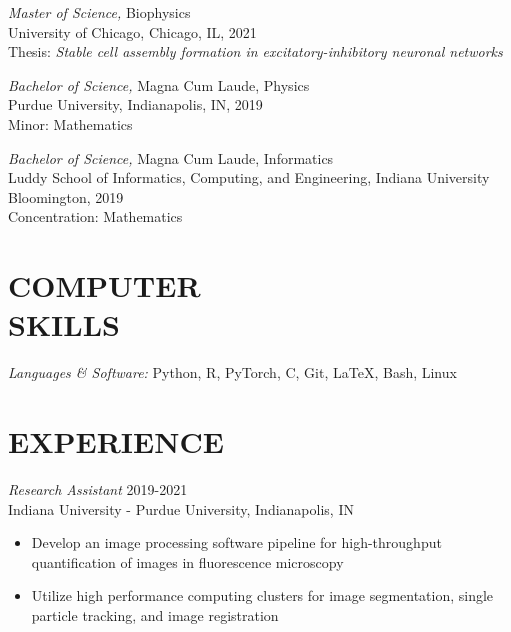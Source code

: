 \documentclass[margin, 10pt]{res} %
\begin{document}
\begin{resume}
{\sl Master of Science,} Biophysics\\
University of Chicago, Chicago, IL, 2021\\
Thesis: \textit{Stable cell assembly formation in excitatory-inhibitory neuronal networks}


{\sl Bachelor of Science,} Magna Cum Laude, Physics \\
Purdue University, Indianapolis, IN, 2019\\
Minor: Mathematics 

{\sl Bachelor of Science,} Magna Cum Laude, Informatics \\
Luddy School of Informatics, Computing, and Engineering, Indiana University Bloomington, 2019\\
Concentration: Mathematics 
 


\section{COMPUTER \\ SKILLS} 

{\sl Languages \& Software:} 
Python, R, PyTorch, C, Git, LaTeX, Bash, Linux\\
 
 
\section{EXPERIENCE}

{\sl Research Assistant} \hfill 2019-2021 \\
Indiana University - Purdue University, Indianapolis, IN

\begin{itemize} \itemsep -2pt %

\item Develop an image processing software pipeline for high-throughput quantification of images in fluorescence microscopy

\item Utilize high performance computing clusters for image segmentation, single particle tracking, and image registration
 

\end{itemize}
\end{resume}
\end{document}
